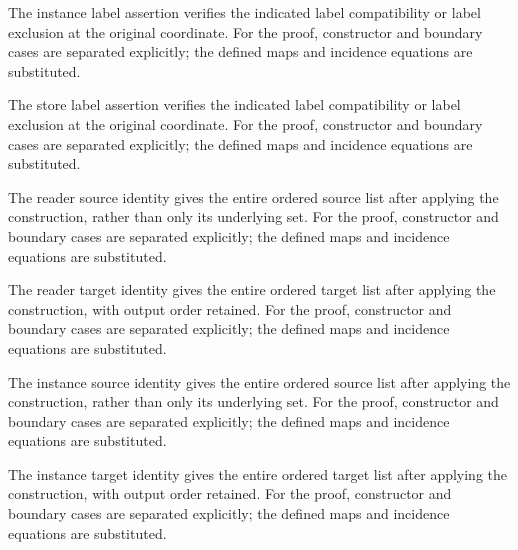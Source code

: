 The instance label assertion verifies the indicated label compatibility or label exclusion at the original coordinate.
For the proof, constructor and boundary cases are separated explicitly; the defined maps and incidence equations are substituted.
\par{}

The store label assertion verifies the indicated label compatibility or label exclusion at the original coordinate.
For the proof, constructor and boundary cases are separated explicitly; the defined maps and incidence equations are substituted.
\par{}

The reader source identity gives the entire ordered source list after applying the construction, rather than only its underlying set.
For the proof, constructor and boundary cases are separated explicitly; the defined maps and incidence equations are substituted.
\par{}

The reader target identity gives the entire ordered target list after applying the construction, with output order retained.
For the proof, constructor and boundary cases are separated explicitly; the defined maps and incidence equations are substituted.
\par{}

The instance source identity gives the entire ordered source list after applying the construction, rather than only its underlying set.
For the proof, constructor and boundary cases are separated explicitly; the defined maps and incidence equations are substituted.
\par{}

The instance target identity gives the entire ordered target list after applying the construction, with output order retained.
For the proof, constructor and boundary cases are separated explicitly; the defined maps and incidence equations are substituted.
\par{}

